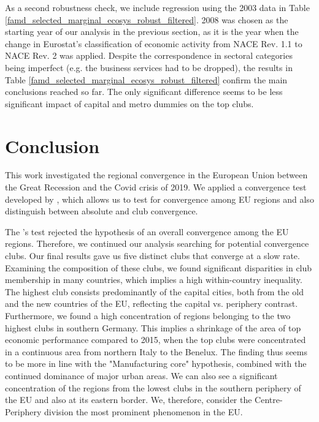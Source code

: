 \documentclass[11pt]{article}
\begin{document}
As a second robustness check, we include regression using the 2003 data in Table \ref{famd_selected_marginal_ecosys_robust_filtered}.  2008 was chosen as the starting year of our analysis in the previous section, as it is the year when the change in Eurostat's classification of economic activity from NACE Rev. 1.1 to NACE Rev. 2 was applied.  Despite the correspondence in sectoral categories being imperfect (e.g. the business services had to be dropped), the results in Table \ref{famd_selected_marginal_ecosys_robust_filtered} confirm the main conclusions reached so far. The only significant difference seems to be less significant impact of capital and metro dummies on the top clubs.

\section{Conclusion}

This work investigated the regional convergence in the European Union between the Great Recession and the Covid crisis of 2019. We applied a convergence test developed by \citet{phillips2009economic}, which allows us to test for convergence among EU regions and also distinguish between absolute and club convergence.

The \citeauthor{phillips2009economic}'s test rejected the hypothesis of an overall convergence among the EU regions. Therefore, we continued our analysis searching for potential convergence clubs. Our final results gave us five distinct clubs 
that converge at a slow rate. Examining the composition of these clubs, we found significant disparities in club membership in many countries, which implies a high within-country inequality. The highest club consists predominantly of the capital cities, both from the old and the new countries of the EU, reflecting the capital vs. periphery contrast. Furthermore, we found a high concentration of regions belonging to the two highest clubs in southern Germany. This implies a shrinkage of the area of top economic performance compared to 2015, when the top clubs were concentrated in a continuous area from northern Italy to the Benelux. The finding thus seems to be more in line with the "Manufacturing core" hypothesis, combined with the continued dominance of major urban areas. We can also see a significant concentration of the regions from the lowest clubs in the southern periphery of the EU and also at its eastern border. We, therefore, consider the Centre-Periphery division the most prominent phenomenon in the EU.
\end{document}
